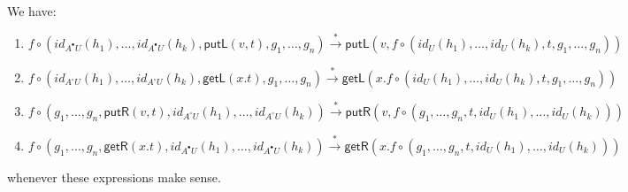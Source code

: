 \documentclass[twoside,11pt,final]{entics}
\newcommand{\getl}{\mathsf{getL}}
\newcommand{\putr}{\mathsf{putR}}
\newcommand{\getr}{\mathsf{getR}}
\newcommand{\putl}{\mathsf{putL}}
\newcommand{\seq}{,\!\ldots\!,}
\begin{document}
\begin{lemma}\label{lem:pop-across-id}
  We have:
  \begin{enumerate}
  \item 
    $f \circ (id_{A^\bullet U}(h_1) \seq id_{A^\bullet U}(h_k) , \putl(v,t) , g_1 \seq g_n)
    \stackrel{*}{\to} 
    \putl(v,f \circ (id_{U}(h_1)  \seq id_{U}(h_k) , t , g_1 \seq g_n))$
  \item 
    $f \circ (id_{A^\circ U}(h_1) \seq id_{A^\circ U}(h_k) , \getl(x.t) , g_1 \seq g_n)
    \stackrel{*}{\to} 
    \getl(x.f \circ (id_{U}(h_1)  \seq  id_{U}(h_k) , t , g_1 \seq g_n))$
  \item 
    $f \circ (g_1 \seq g_n , \putr(v,t) , id_{A^\circ U}(h_{1}) \seq id_{A^\circ U}(h_k))
    \stackrel{*}{\to} 
    \putr(v,f \circ (g_1 \seq g_n , t , id_{U}(h_1) \seq id_{U}(h_k)))$
  \item 
    $f \circ (g_1 \seq g_n , \getr(x.t) , id_{A^\bullet U}(h_{1}) \seq id_{A^\bullet U}(h_k))
    \stackrel{*}{\to} 
    \getr(x.f \circ (g_1 \seq g_n , t , id_{U}(h_1)  \seq  id_{U}(h_k)))$
  \end{enumerate}
  whenever these expressions make sense.
\end{lemma}
\end{document}

